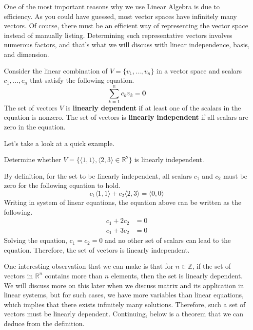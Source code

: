 \documentclass[../main.tex]{subfiles}
\begin{document}
One of the most important reasons why we use Linear Algebra is due to
efficiency. As you could have guessed, most vector spaces have
infinitely many vectors. Of course, there must be an efficient way
of representing the vector space instead of manually listing.
Determining such representative vectors involves numerous factors,
and that's what we will discuss with linear independence, basis,
and dimension.

\begin{definition}{}{}
Consider the linear combination of $V = \{ v_1, \ldots, v_n \}$
in a vector space and scalars $c_1, \ldots, c_n$ that satisfy the
following equation.
\[
\sum_{k = 1}^n c_k v_k = \mathbf{0}
\]
The set of vectors $V$ is \textbf{linearly dependent} if at least
one of the scalars in the equation is nonzero. The set of vectors is
\textbf{linearly independent} if all scalars are zero in the equation.
\end{definition}

Let's take a look at a quick example.

\begin{problem}{}{}
Determine whether $V = \{ \langle 1, 1 \rangle, \langle 2, 3\rangle
\in \mathbb{R}^2 \}$ is linearly independent.
\end{problem}
\begin{solution}
By definition, for the set to be linearly independent, all scalars
$c_1$ and $c_2$ must be zero for the following equation to hold.
\[
c_1 \langle 1, 1 \rangle + c_2 \langle 2, 3 \rangle
= \langle 0, 0 \rangle
\]
Writing in system of linear equations, the equation above can
be written as the following.
\begin{align*}
    c_1 + 2c_2 &= 0 \\
    c_1 + 3c_2 &= 0
\end{align*}
Solving the equation, $c_1 = c_2 = 0$ and no other set of scalars
can lead to the equation. Therefore, the set of vectors is linearly
independent.
\end{solution}

One interesting observation that we can make is that for $n \in
\mathbb{Z}$, if the set of vectors in $\mathbb{R}^n$ contains more
than $n$ elements, then the set is linearly dependent. We will
discuss more on this later when we discuss matrix and its application
in linear systems, but for such cases, we have more variables than
linear equations, which implies that there exists infinitely many
solutions. Therefore, such a set of vectors must be linearly
dependent. Continuing, below is a theorem that we can deduce from
the definition.
\end{document}
